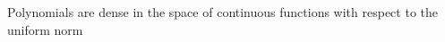 \begin{myTheorem}
Polynomials are dense in the space of continuous functions with respect to the uniform norm
\end{myTheorem}

\endinput  %